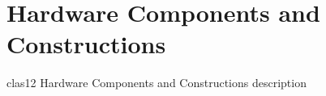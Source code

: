 \section{Hardware Components and Constructions}

clas12 Hardware Components and Constructions description

